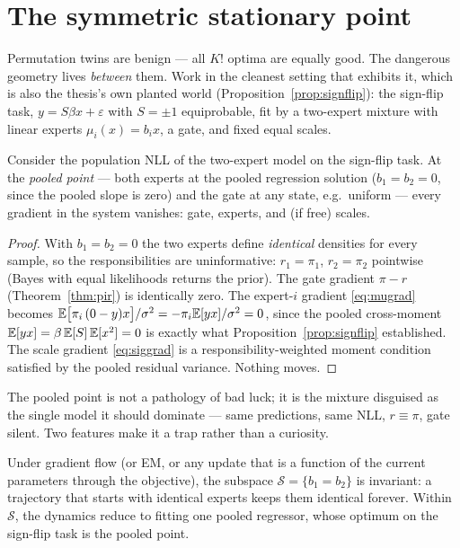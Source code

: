\section{The symmetric stationary point}\label{sec:symtrap}

Permutation twins are benign --- all $K!$ optima are equally good. The
dangerous geometry lives \emph{between} them. Work in the cleanest
setting that exhibits it, which is also the thesis's own planted world
(Proposition~\ref{prop:signflip}): the sign-flip task,
$y = S\beta x + \varepsilon$ with $S = \pm 1$ equiprobable, fit by a
two-expert mixture with linear experts $\mu_i(x) = b_i x$, a gate, and
fixed equal scales.

\begin{proposition}\label{prop:pooled}
Consider the population NLL of the two-expert model on the sign-flip
task. At the \emph{pooled point} --- both experts at the pooled
regression solution ($b_1 = b_2 = 0$, since the pooled slope is zero)
and the gate at any state, e.g.\ uniform --- every gradient in the
system vanishes: gate, experts, and (if free) scales.
\end{proposition}

\begin{proof}
With $b_1 = b_2 = 0$ the two experts define \emph{identical} densities
for every sample, so the responsibilities are uninformative:
$r_1 = \pi_1$, $r_2 = \pi_2$ pointwise (Bayes with equal likelihoods
returns the prior). The gate gradient $\pi - r$ (Theorem~\ref{thm:pir})
is identically zero. The expert-$i$ gradient \eqref{eq:mugrad} becomes
$\mathbb{E}\bigl[\pi_i\,(0 - y)x\bigr]/\sigma^2 = -\pi_i \mathbb{E}[yx]/\sigma^2 = 0$,
since the pooled cross-moment $\mathbb{E}[yx] = \beta\,\mathbb{E}[S]\,\mathbb{E}[x^2] = 0$ is
exactly what Proposition~\ref{prop:signflip} established. The scale
gradient \eqref{eq:siggrad} is a responsibility-weighted moment
condition satisfied by the pooled residual variance. Nothing moves.
\end{proof}

The pooled point is not a pathology of bad luck; it is the mixture
disguised as the single model it should dominate --- same predictions,
same NLL, $r \equiv \pi$, gate silent. Two features make it a trap
rather than a curiosity.

\begin{proposition}
\label{prop:invariant}
Under gradient flow (or EM, or any update that is a function of the
current parameters through the objective), the subspace
$\mathcal{S} = \{b_1 = b_2\}$ is invariant: a trajectory that starts
with identical experts keeps them identical forever. Within
$\mathcal{S}$, the dynamics reduce to fitting one pooled regressor,
whose optimum on the sign-flip task is the pooled point.
\end{proposition}

